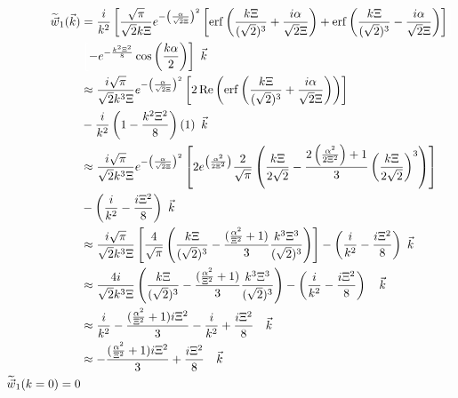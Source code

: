 \documentclass[double,12pt]{beavtex}
\begin{document}
\begin{align}
   \widetilde{\vec{w}}_1(\vec{k}) &= \frac{i}{k^2}\left[\frac{\sqrt{\pi}}{\sqrt{2}k\Xi}
   e^{-\left(\frac{\alpha}{\sqrt{2}\Xi}\right)^2}\left[\operatorname{erf}
   \left(\frac{k\Xi}{(\sqrt{2})^3}+\frac{i\alpha}{\sqrt{2}\Xi}\right)
   +\operatorname{erf}\left(\frac{k\Xi}{(\sqrt{2})^3}-\frac{i\alpha}{\sqrt{2}\Xi}
   \right)\right]\color{white}\right]\color{black}  \nonumber \\
 & \color{white}\left[\color{black}-e^{-\frac{k^2\Xi^2}{8}}\cos\left(\frac{k\alpha}{2}\right)\right]{~}\color{black}\vec{k} \\
    & \approx  \frac{i\sqrt{\pi}}{\sqrt{2}k^3\Xi}e^{-\left(\frac{\alpha}{\sqrt{2}\Xi}\right)^2}\left[2\operatorname{Re}\left(\operatorname{erf}\left(\frac{k\Xi}{(\sqrt{2})^3}+\frac{i\alpha}{\sqrt{2}\Xi}\right)\right)\right] \nonumber \\
    &-\frac{i}{k^2}\left(1-\frac{k^2\Xi^2}{8}\right)\left(1\right) {~}\vec{k} \\
    & \approx  \frac{i\sqrt{\pi}}{\sqrt{2}k^3\Xi}e^{-\left(\frac{\alpha}{\sqrt{2}\Xi}\right)^2}\left[2e^{\left(\frac{\alpha^2}{2\Xi^2}\right)}\frac{2}{\sqrt{\pi}}   \left(\frac{k\Xi}{2\sqrt{2}}   -\frac{2\left(\frac{\alpha^2}{2\Xi^2}\right)+1}{3}\left(\frac{k\Xi}{2\sqrt{2}}\right)^3\right)\right] \nonumber \\
    &-\left(\frac{i}{k^2}-\frac{i\Xi^2}{8}\right) {~}\vec{k}\\
    & \approx  \frac{i\sqrt{\pi}}{\sqrt{2}k^3\Xi}\left[\frac{4}{\sqrt{\pi}}\left(\frac{k\Xi}{(\sqrt{2})^3} -\frac{(\frac{\alpha^2}{\Xi^2}+1)}{3}\frac{k^3\Xi^3}{(\sqrt{2})^3}\right)\right] -\left(\frac{i}{k^2}-\frac{i\Xi^2}{8}\right) {~}\vec{k}\\
    & \approx  \frac{4i}{\sqrt{2}k^3\Xi}\left(\frac{k\Xi}{(\sqrt{2})^3} -\frac{(\frac{\alpha^2}{\Xi^2}+1)}{3}\frac{k^3\Xi^3}{(\sqrt{2})^3}\right)-\left(\frac{i}{k^2}-\frac{i\Xi^2}{8}\right) {~~~}\vec{k}\\
    & \approx  \frac{i}{k^2} -\frac{(\frac{\alpha^2}{\Xi^2}+1)i\Xi^2}{3}-\frac{i}{k^2}+\frac{i\Xi^2}{8} {~~~}\vec{k}\\
    & \approx  -\frac{(\frac{\alpha^2}{\Xi^2}+1)i\Xi^2}{3}+\frac{i\Xi^2}{8} {~~~}\vec{k}\\
     \widetilde{\vec w}_1(k=0) = 0 
\end{align}
\end{document}
